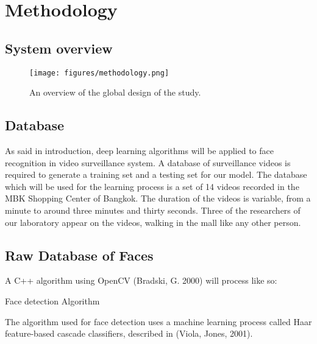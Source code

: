 \setlength{\footskip}{8mm}

\chapter{Methodology}
\label{ch:methodology}

\section{System overview}

\begin{figure}[!ht]
  \centering
  \texttt{[image: figures/methodology.png]}  
  \caption[An overview of the global design of the study.]{An overview of the global design of the study.}
  \label{fig:Methodology}
\end{figure}


\section{Database}
As said in introduction, deep learning algorithms will be applied to face recognition in video surveillance system. A database of surveillance videos is required to generate a training set and a testing set for our model.
The database which will be used for the learning process is a set of 14 videos recorded in the MBK Shopping Center of Bangkok. The duration of the videos is variable, from a minute to around three minutes and thirty seconds. Three of the researchers of our laboratory appear on the videos, walking in the mall like any other person.

\section{Raw Database of Faces}

A C++ algorithm using OpenCV (Bradski, G. 2000) will process like so:

\begin{algorithm}[H]
 \caption{Face detection Algorithm}
\end{algorithm}

The algorithm used for face detection uses a machine learning process called Haar feature-based cascade classifiers, described in (Viola, Jones, 2001).

